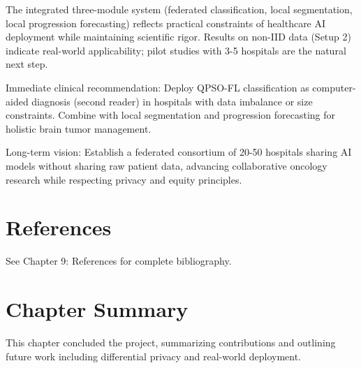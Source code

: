 The integrated three-module system (federated classification, local segmentation, local progression forecasting) reflects practical constraints of healthcare AI deployment while maintaining scientific rigor. Results on non-IID data (Setup 2) indicate real-world applicability; pilot studies with 3-5 hospitals are the natural next step.

Immediate clinical recommendation: Deploy QPSO-FL classification as computer-aided diagnosis (second reader) in hospitals with data imbalance or size constraints. Combine with local segmentation and progression forecasting for holistic brain tumor management.

Long-term vision: Establish a federated consortium of 20-50 hospitals sharing AI models without sharing raw patient data, advancing collaborative oncology research while respecting privacy and equity principles.


\section{References}
See Chapter 9: References for complete bibliography.


\section{Chapter Summary}
This chapter concluded the project, summarizing contributions and outlining future work including differential privacy and real-world deployment.
